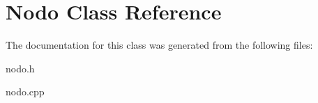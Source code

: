 \hypertarget{classNodo}{\section{Nodo Class Reference}
\label{classNodo}
}


The documentation for this class was generated from the following files\+:\begin{DoxyCompactItemize}
\item 
nodo.\+h\item 
nodo.\+cpp\end{DoxyCompactItemize}

